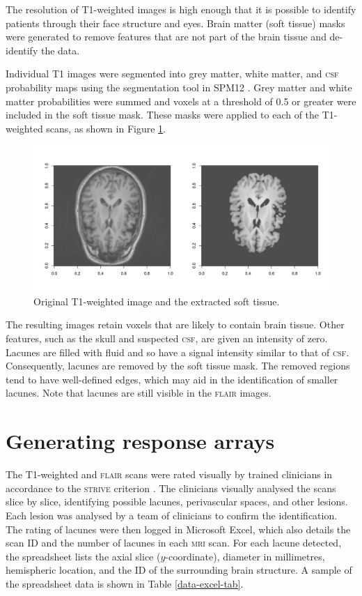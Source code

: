 The resolution of T1-weighted images is high enough that it is possible to identify patients through their face structure and eyes. Brain matter (soft tissue) masks were generated to remove features that are not part of the brain tissue and de-identify the data.

Individual T1 images were segmented into grey matter, white matter, and \textsc{csf} probability maps using the segmentation tool in SPM12 \citeyearpar{spm12}. Grey matter and white matter probabilities were summed and voxels at a threshold of 0.5 or greater were included in the soft tissue mask. These masks were applied to each of the T1-weighted scans, as shown in Figure \ref{data-t1-soft-fig}.

\begin{figure}[ht]
\centering
\includegraphics[width=\linewidth]{Images/6_t1_soft_eg.png}
\caption{Original T1-weighted image and the extracted soft tissue.}
\label{data-t1-soft-fig}
\end{figure}

The resulting images retain voxels that are likely to contain brain tissue. Other features, such as the skull and suspected \textsc{csf}, are given an intensity of zero. Lacunes are filled with fluid and so have a signal intensity similar to that of \textsc{csf}. Consequently, lacunes are removed by the soft tissue mask. The removed regions tend to have well-defined edges, which may aid in the identification of smaller lacunes. Note that lacunes are still visible in the \textsc{flair} images.

\section{Generating response arrays}\label{data-lacune}

The T1-weighted and \textsc{flair} scans were rated visually by trained clinicians in accordance to the \textsc{strive} criterion \cite{WardlawJ.M.2013Nsfr}. The clinicians visually analysed the scans slice by slice, identifying possible lacunes, perivascular spaces, and other lesions. Each lesion was analysed by a team of clinicians to confirm the identification. The rating of lacunes were then logged in Microsoft Excel, which also details the scan ID and the number of lacunes in each \textsc{mri} scan. For each lacune detected, the spreadsheet lists the axial slice ($y$-coordinate), diameter in millimetres, hemispheric location, and the ID of the surrounding brain structure. A sample of the spreadsheet data is shown in Table \ref{data-excel-tab}.

